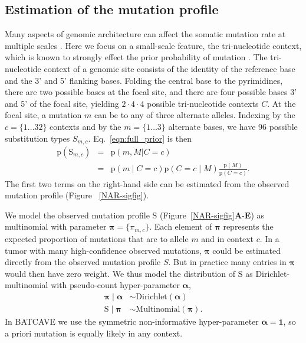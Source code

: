 \documentclass[a4,center,fleqn]{NAR}
\newcommand{\batcave}{BATCAVE }
\begin{document}
\subsection{Estimation of the mutation profile}
Many aspects of genomic architecture can affect the somatic mutation rate at multiple scales \cite{Buisson2019}.
Here we focus on a small-scale feature, the tri-nucleotide context, which is known to strongly effect the prior probability of mutation \citep{Nik-Zainal2012a,Alexandrov2015,Lee-Six2018}.
The tri-nucleotide context of a genomic site consists of the identity of the reference base and the 3' and 5' flanking bases.
Folding the central base to the pyrimidines, there are two possible bases at the focal site, and there are four possible bases 3' and 5' of the focal site, yielding $2 \cdot 4 \cdot 4$ possible tri-nucleotide contexts $C$.
At the focal site, a mutation $m$ can be to any of three alternate alleles.
Indexing by the $c=\{1 \dots 32\}$ contexts and by the $m = \{1 \dots 3\}$ alternate bases, we have 96 possible substitution types $S_{m,c}$.
Eq.~\ref{eqn:full_prior} is then
\begin{equation}
  \label{eqn:detailed_prior}
  \begin{array}{rcl}
  \mathrm{p}(\mathrm{S}_{m,c}) &=&  \mathrm{p}(m, M | C = c) \\
                            &=& \mathrm{p}(m \mid C = c) \mathrm{p}(C = c \mid M)\frac{\mathrm{p}(M)}{\mathrm{p}(C = c)}.
  \end{array}
\end{equation}
The first two terms on the right-hand side can be estimated from the observed mutation profile (Figure ~\ref{NAR-sigfig}).

We model the observed mutation profile $\mathrm{S}$ (Figure~\ref{NAR-sigfig}\textbf{A}-\textbf{E}) as multinomial with parameter $\boldsymbol{\pi} = \{\pi_{m,c}\}$.
Each element of $\boldsymbol{\pi}$ represents the expected proportion of mutations that are to allele $m$ and in context $c$.
In a tumor with many high-confidence observed mutations, $\boldsymbol{\pi}$ could be estimated directly from the observed mutation profile $S$.
But in practice many entries in $\boldsymbol{\pi}$ would then have zero weight.
We thus model the distribution of $\mathrm{S}$ as Dirichlet-multinomial with pseudo-count hyper-parameter $\boldsymbol{\alpha}$, 
\begin{equation}
\begin{aligned}
  \boldsymbol{\pi} \mid \boldsymbol{\alpha} &\sim \textrm{Dirichlet}(\boldsymbol{\alpha}) \\
  \mathrm{S} \mid \boldsymbol{\pi} & \sim \textrm{Multinomial}(\boldsymbol{\pi}).
\end{aligned}
\end{equation}
In \batcave we use the symmetric non-informative hyper-parameter $\boldsymbol{\alpha} = \boldsymbol{1}$, so a priori mutation is equally likely in any context.
\end{document}
